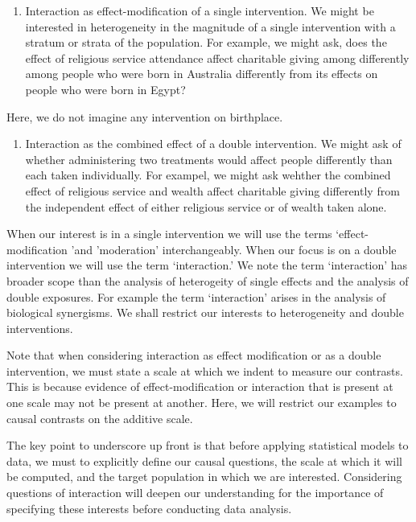 \documentclass[
  single column]{article}
\providecommand{\tightlist}{%
  \setlength{\itemsep}{0pt}\setlength{\parskip}{0pt}}\usepackage{longtable,booktabs,array}
\begin{document}
\begin{enumerate}
\def\labelenumi{(\arabic{enumi})}
\tightlist
\item
  Interaction as effect-modification of a single intervention. We might
  be interested in heterogeneity in the magnitude of a single
  intervention with a stratum or strata of the population. For example,
  we might ask, does the effect of religious service attendance affect
  charitable giving among differently among people who were born in
  Australia differently from its effects on people who were born in
  Egypt?
\end{enumerate}

Here, we do not imagine any intervention on birthplace.

\begin{enumerate}
\def\labelenumi{(\arabic{enumi})}
\setcounter{enumi}{1}
\tightlist
\item
  Interaction as the combined effect of a double intervention. We might
  ask of whether administering two treatments would affect people
  differently than each taken individually. For exampel, we might ask
  wehther the combined effect of religious service and wealth affect
  charitable giving differently from the independent effect of either
  religious service or of wealth taken alone.
\end{enumerate}

When our interest is in a single intervention we will use the terms
`effect-modification 'and 'moderation' interchangeably. When our focus
is on a double intervention we will use the term `interaction.' We note
the term `interaction' has broader scope than the analysis of
heterogeity of single effects and the analysis of double exposures. For
example the term `interaction' arises in the analysis of biological
synergisms. We shall restrict our interests to heterogeneity and double
interventions.

Note that when considering interaction as effect modification or as a
double intervention, we must state a scale at which we indent to measure
our contrasts. This is because evidence of effect-modification or
interaction that is present at one scale may not be present at another.
Here, we will restrict our examples to causal contrasts on the additive
scale.

The key point to underscore up front is that before applying statistical
models to data, we must to explicitly define our causal questions, the
scale at which it will be computed, and the target population in which
we are interested. Considering questions of interaction will deepen our
understanding for the importance of specifying these interests before
conducting data analysis.
\end{document}

